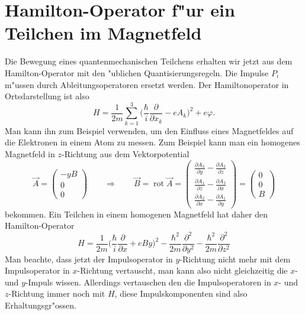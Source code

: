 \section{Hamilton-Operator f"ur ein Teilchen im Magnetfeld\label{section:hamilton-operator-im-magnetfeld}}
Die Bewegung eines quantenmechanischen Teilchens erhalten wir jetzt
aus dem Hamilton-Operator mit den "ublichen Quantisierungsregeln.
Die Impulse $P_i$ m"ussen durch Ableitungsoperatoren ersetzt werden.
Der Hamiltonoperator in Ortsdarstellung ist also
\[
H=\frac1{2m}\sum_{k=1}^3\biggl(
\frac{\hbar}{i}
\frac{\partial}{\partial x_k}
-eA_k
\biggr)^2
+e\varphi.
\]
Man kann ihn zum Beispiel verwenden, um den Einfluss eines Magnetfeldes
auf die Elektronen in einem Atom zu messen.
Zum Beispiel kann man ein homogenes Magnetfeld in $z$-Richtung
aus dem Vektorpotential
\[
\vec A=\begin{pmatrix}
-yB\\0\\0
\end{pmatrix}
\qquad
\Rightarrow
\qquad
\vec B=\operatorname{rot}\vec A
=\begin{pmatrix}
\frac{\partial A_3}{\partial y}-\frac{\partial A_2}{\partial z}\\
\frac{\partial A_1}{\partial z}-\frac{\partial A_3}{\partial x}\\
\frac{\partial A_2}{\partial x}-\frac{\partial A_1}{\partial y}
\end{pmatrix}
=
\begin{pmatrix}
0\\0\\B
\end{pmatrix}
\]
bekommen.
Ein Teilchen in einem homogenen Magnetfeld hat daher den Hamilton-Operator
\[
H
=
\frac1{2m}\biggl(\frac{\hbar}{i}\frac{\partial}{\partial x}+eBy\biggr)^2
-\frac{\hbar^2}{2m}\frac{\partial^2}{\partial y^2}
-\frac{\hbar^2}{2m}\frac{\partial^2}{\partial z^2}
\]
Man beachte, dass jetzt der Impulsoperator in $y$-Richtung nicht mehr
mit dem Impulsoperator in $x$-Richtung vertauscht, man kann also
nicht gleichzeitig die $x$- und $y$-Impuls wissen.
Allerdings vertauschen den die Impulsoperatoren in $x$- und $z$-Richtung
immer noch mit $H$, diese Impulskomponenten sind also Erhaltungsgr"ossen.

